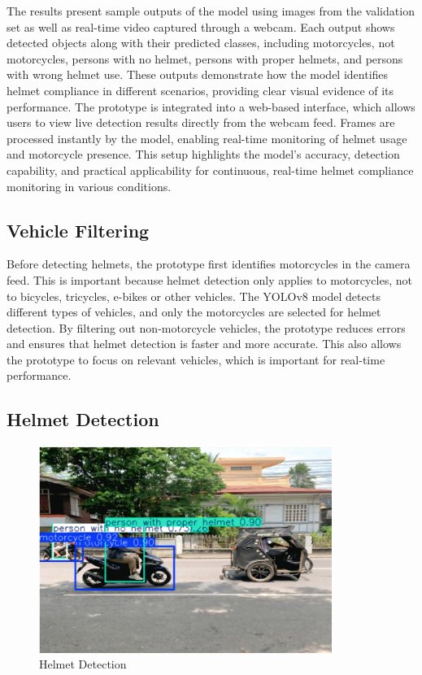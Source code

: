 \begin{refsection}
\noindent
The results present sample outputs of the model using images from the validation set as well as real-time video captured through a webcam. Each output shows detected objects along with their predicted classes, including motorcycles, not motorcycles, persons with no helmet, persons with proper helmets, and persons with wrong helmet use. These outputs demonstrate how the model identifies helmet compliance in different scenarios, providing clear visual evidence of its performance. The prototype is integrated into a web-based interface, which allows users to view live detection results directly from the webcam feed. Frames are processed instantly by the model, enabling real-time monitoring of helmet usage and motorcycle presence. This setup highlights the model’s accuracy, detection capability, and practical applicability for continuous, real-time helmet compliance monitoring in various conditions.

\subsection{Vehicle Filtering}

Before detecting helmets, the prototype first identifies motorcycles in the camera feed. This is important because helmet detection only applies to motorcycles, not to bicycles, tricycles, e-bikes or other vehicles. The YOLOv8 model detects different types of vehicles, and only the motorcycles are selected for helmet detection. By filtering out non-motorcycle vehicles, the prototype reduces errors and ensures that helmet detection is faster and more accurate. This also allows the prototype to focus on relevant vehicles, which is important for real-time performance. 

\subsection{Helmet Detection}

\begin{figure}[ht]
    \centering
	\includegraphics[width=0.85\textwidth]{figures/Fig 20.jpg}
	\caption[Helmet Detection]{Helmet Detection}
	\label{fig:helmet_detection}
\end{figure}


\end{refsection}
